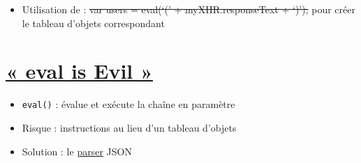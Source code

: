 \begin{english}

\begin{Shaded}
\begin{Highlighting}[]
\OtherTok{[}
  \FunctionTok{\{}\FunctionTok{:} \FunctionTok{,} \FunctionTok{:} \FunctionTok{\}}\OtherTok{,}
  \FunctionTok{\{}\FunctionTok{:} \FunctionTok{,}  \FunctionTok{:} \FunctionTok{\}}\OtherTok{,}
  \FunctionTok{\{}\FunctionTok{:} \FunctionTok{,}    \FunctionTok{:} \FunctionTok{\}}
\OtherTok{]}
\end{Highlighting}
\end{Shaded}

\end{english}

\begin{itemize}
\tightlist
\item
  Utilisation de : \sout{var users = eval(`(' + myXHR.responseText +
  `)');} pour créer le tableau d'objets correspondant
\end{itemize}

\hypertarget{eval-is-evil-22}{%
\section{\texorpdfstring{\href{https://javascriptweblog.wordpress.com/2010/04/19/how-evil-is-eval/}{«
eval is Evil »}}{« eval is Evil »}}\label{eval-is-evil-22}}

\begin{itemize}
\tightlist
\item
  \textenglish{\texttt{eval()}} : évalue et exécute la chaîne en
  paramètre
\item
  Risque : instructions au lieu d'un tableau d'objets
\item
  Solution : le
  \href{https://developer.mozilla.org/fr/docs/Web/JavaScript/Reference/Objets_globaux/JSON/parse}{parser}
  JSON
\end{itemize}

\begin{english}

\begin{Shaded}
\begin{Highlighting}[]
\OperatorTok{=} \NormalTok{)}\OperatorTok{;}
\OperatorTok{=} \OperatorTok{;}
\end{Highlighting}
\end{Shaded}

\end{english}

